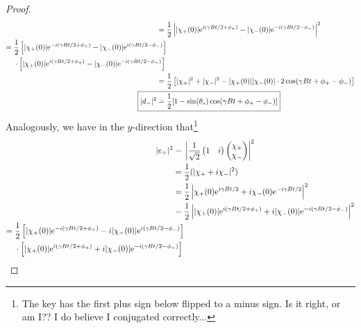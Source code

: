 \documentclass[../psets.tex]{subfiles}
\begin{document}
\begin{enumerate}
\begin{enumerate}
\begin{proof}
\begin{align*}
                ={}& \frac{1}{2}\left| |\chi_+(0)|\e[i(\gamma Bt/2+\phi_+)]-|\chi_-(0)|\e[-i(\gamma Bt/2-\phi_-)] \right|^2\\
                \begin{split}
                    ={}& \frac{1}{2}\left[ |\chi_+(0)|\e[-i(\gamma Bt/2+\phi_+)]-|\chi_-(0)|\e[i(\gamma Bt/2-\phi_-)] \right]\\
                    & \cdot\left[ |\chi_+(0)|\e[i(\gamma Bt/2+\phi_+)]-|\chi_-(0)|\e[-i(\gamma Bt/2-\phi_-)] \right]
                \end{split}\\
                ={}& \frac{1}{2}\left[ |\chi_+|^2+|\chi_-|^2-|\chi_+(0)||\chi_-(0)|\cdot 2\cos(\gamma Bt+\phi_+-\phi_-) \right]\\
                \Aboxed{|d_-|^2 ={}& \frac{1}{2}[1-\sin(\theta_s)\cos(\gamma Bt+\phi_+-\phi_-)]}
            \end{align*}
            Analogously, we have in the $y$-direction that\footnote{The key has the first plus sign below flipped to a minus sign. Is it right, or am I?? I do believe I conjugated correctly...}
            \begin{align*}
                |e_+|^2 ={}& \left|
                    \frac{1}{\sqrt{2}}
                    \begin{pmatrix}
                        1 & i\\
                    \end{pmatrix}
                    \begin{pmatrix}
                        \chi_+\\
                        \chi_-\\
                    \end{pmatrix}
                \right|^2\\
                ={}& \frac{1}{2}(|\chi_++i\chi_-|^2)\\
                ={}& \frac{1}{2}\left| \chi_+(0)\e[i\gamma Bt/2]+i\chi_-(0)\e[-i\gamma Bt/2] \right|^2\\
                ={}& \frac{1}{2}\left| |\chi_+(0)|\e[i(\gamma Bt/2+\phi_+)]+i|\chi_-(0)|\e[-i(\gamma Bt/2-\phi_-)] \right|^2\\
                \begin{split}
                    ={}& \frac{1}{2}\left[ |\chi_+(0)|\e[-i(\gamma Bt/2+\phi_+)]-i|\chi_-(0)|\e[i(\gamma Bt/2-\phi_-)] \right]\\
                    & \cdot\left[ |\chi_+(0)|\e[i(\gamma Bt/2+\phi_+)]+i|\chi_-(0)|\e[-i(\gamma Bt/2-\phi_-)] \right]

\end{split}
\end{align*}
\end{proof}
\end{enumerate}
\end{enumerate}
\end{document}
